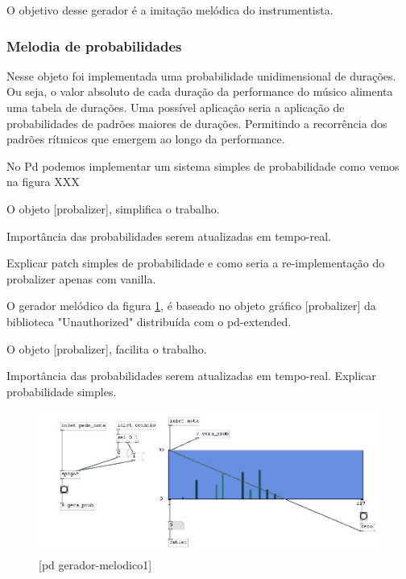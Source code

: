\documentclass{ppgmus}
\begin{document}
O objetivo desse gerador é a imitação melódica
do instrumentista.

\subsubsection{Melodia de probabilidades}



Nesse objeto foi implementada uma probabilidade unidimensional
de durações. Ou seja, o valor absoluto de cada duração
da performance do músico alimenta uma tabela de durações.
Uma possível aplicação seria a aplicação de probabilidades de 
padrões maiores de durações. Permitindo a recorrência dos padrões
rítmicos que emergem ao longo da performance.


No Pd podemos implementar um sistema simples de probabilidade como 
vemos na figura XXX




O objeto [probalizer], simplifica o trabalho.

Importância das probabilidades serem atualizadas em
tempo-real.

Explicar patch simples de probabilidade e como
seria a re-implementação do probalizer apenas com vanilla.


O gerador melódico da figura \ref{gera-melodico1}, é baseado
no objeto gráfico [probalizer] da biblioteca "Unauthorized"
distribuída com o pd-extended.

O objeto [probalizer], facilita o trabalho.

Importância das probabilidades serem atualizadas em
tempo-real.
Explicar probabilidade simples.

\begin{figure}[!ht]
\includegraphics[scale=.6]{gera-melodico1}
\caption{[pd gerador-melodico1]}
\label{gera-melodico1}
\end{figure}  
\end{document}
